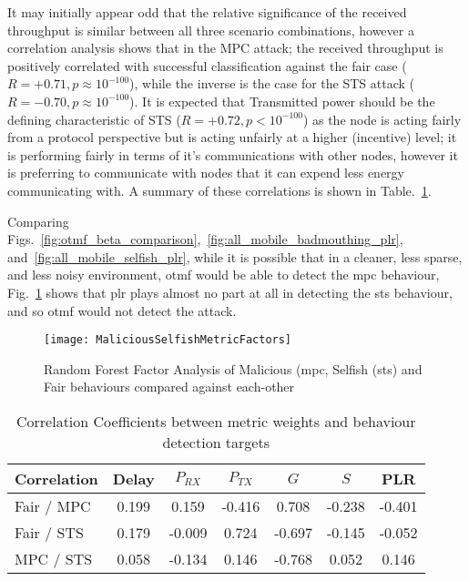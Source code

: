 It may initially appear odd that the relative significance of the received throughput is similar between all three scenario combinations, however a correlation analysis shows that in the MPC attack; the received throughput is positively correlated with successful classification against the fair case ($R=+0.71, p\approx10^{-100}$), while the inverse is the case for the STS attack ($R=-0.70, p\approx10^{-100}$).
It is expected that Transmitted power should be the defining characteristic of STS ($R=+0.72, p<10^{-100}$) as the node is acting fairly from a protocol perspective but is acting unfairly at a higher (incentive) level; it is performing fairly in terms of it's communications with other nodes, however it is preferring to communicate with nodes that it can expend less energy communicating with.
A summary of these correlations is shown in Table.~\ref{tab:correlations}.

Comparing Figs.~\ref{fig:otmf_beta_comparison},~\ref{fig:all_mobile_badmouthing_plr}, and~\ref{fig:all_mobile_selfish_plr}, while it is possible that in a cleaner, less sparse, and less noisy environment, \gls{otmf} would be able to detect the \gls{mpc} behaviour, Fig.~\ref{fig:malselfactors} shows that \gls{plr} plays almost no part at all in detecting the \gls{sts} behaviour, and so \gls{otmf} would not detect the attack.

\begin{figure}
	\centering
	\texttt{[image: MaliciousSelfishMetricFactors]}
	\caption{Random Forest Factor Analysis of Malicious (\gls{mpc}, Selfish (\gls{sts}) and Fair behaviours compared against each-other}
	\label{fig:malselfactors}
\end{figure}

\begin{table}[h]
	\caption{Correlation Coefficients between metric weights and behaviour detection targets} \label{tab:correlations}
	\begin{center}
		\begin{tabular}{lcccccc}
			\toprule
			Correlation      & Delay & $P_{RX}$ & $P_{TX}$ & $G$ & $S$ & PLR \\
			\midrule
			Fair / MPC       & 0.199 &  0.159   & -0.416  &  0.708   & -0.238   & -0.401\\
			Fair / STS       & 0.179 &  -0.009  &  0.724  & -0.697   & -0.145   & -0.052\\
			MPC / STS        & 0.058 &  -0.134  &  0.146  & -0.768   &  0.052   &  0.146\\
			\bottomrule
		\end{tabular}
	\end{center}
\end{table}


